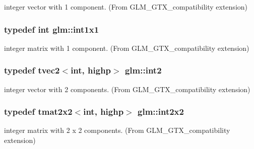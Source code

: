 integer vector with 1 component. (From G\+L\+M\+\_\+\+G\+T\+X\+\_\+compatibility extension) 

\hypertarget{group__gtx__compatibility_ga09016a637a3cd093c22e6188080ac750}{}
\subsubsection[{int1x1}]{\setlength{\rightskip}{0pt plus 5cm}typedef int {\bf glm\+::int1x1}}\label{group__gtx__compatibility_ga09016a637a3cd093c22e6188080ac750}


integer matrix with 1 component. (From G\+L\+M\+\_\+\+G\+T\+X\+\_\+compatibility extension) 

\hypertarget{group__gtx__compatibility_ga89f98d125d3e73b50e34bc35d93796f1}{}
\subsubsection[{int2}]{\setlength{\rightskip}{0pt plus 5cm}typedef tvec2$<$int, highp$>$ {\bf glm\+::int2}}\label{group__gtx__compatibility_ga89f98d125d3e73b50e34bc35d93796f1}


integer vector with 2 components. (From G\+L\+M\+\_\+\+G\+T\+X\+\_\+compatibility extension) 

\hypertarget{group__gtx__compatibility_ga5f407f808d8fa5b771ea7417cedc4868}{}
\subsubsection[{int2x2}]{\setlength{\rightskip}{0pt plus 5cm}typedef tmat2x2$<$int, highp$>$ {\bf glm\+::int2x2}}\label{group__gtx__compatibility_ga5f407f808d8fa5b771ea7417cedc4868}


integer matrix with 2 x 2 components. (From G\+L\+M\+\_\+\+G\+T\+X\+\_\+compatibility extension) 

\hypertarget{group__gtx__compatibility_ga37b2b18255fa5ff7fa23d8b1d34b8034}{}
